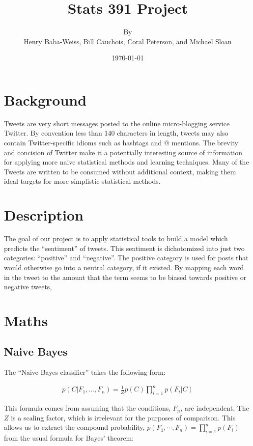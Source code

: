 \documentclass[12pt,a4paper]{article}
\title{Stats 391 Project}
\author{By \\ Henry Baba-Weiss, Bill Cauchois, Coral Peterson, and Michael Sloan}
\date{\today}
\begin{document}
\maketitle
\pagebreak

\section { Background }

Tweets are very short messages posted to the online micro-blogging service Twitter. By convention less than 140 characters in length, tweets may also contain Twitter-specific idioms such as hashtags and @ mentions.  The brevity and concision of Twitter make it a potentially interesting source of information for applying more naive statistical methods and learning techniques.  Many of the Tweets are written to be consumed without additional context, making them ideal targets for more simplistic statistical methods.

\section { Description }

The goal of our project is to apply statistical tools to build a model which predicts the ``sentiment'' of tweets.  This sentiment is dichotomized into just two categories: ``positive'' and ``negative''.  The positive category is used for posts that would otherwise go into a neutral category, if it existed. By mapping each word in the tweet to the amount that the term seems to be biased towards positive or negative tweets, %


\section { Maths }

\subsection { Naive Bayes }

The ``Naive Bayes classifier'' takes the following form:

\begin{align*}
p(C \vert F_1,\dots,F_n) = \frac{1}{Z}  p(C) \prod_{i=1}^n p(F_i \vert C)
\end{align*}

This formula comes from assuming that the conditions, $ F_n $, are independent.  The $ Z $ is a scaling factor, which is irrelevant for the purposes of comparison.  This allows us to extract the compound probability, $ p(F_1,\cdots,F_n) = \prod_{i=1}^n p(F_i) $ from the usual formula for Bayes' theorem:
\end{document}
